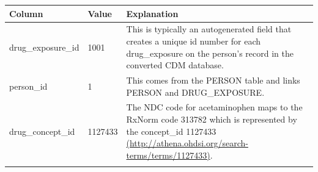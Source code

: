 \documentclass[]{book}
\begin{document}
\begin{longtable}[]{@{}lll@{}}
\toprule
\begin{minipage}[b]{0.30\columnwidth}\raggedright
Column\strut
\end{minipage} & \begin{minipage}[b]{0.14\columnwidth}\raggedright
Value\strut
\end{minipage} & \begin{minipage}[b]{0.48\columnwidth}\raggedright
Explanation\strut
\end{minipage}\tabularnewline
\midrule
\endhead
\begin{minipage}[t]{0.30\columnwidth}\raggedright
drug\_exposure\_id\strut
\end{minipage} & \begin{minipage}[t]{0.14\columnwidth}\raggedright
1001\strut
\end{minipage} & \begin{minipage}[t]{0.48\columnwidth}\raggedright
This is typically an autogenerated field that creates a unique id number for each drug\_exposure on the person's record in the converted CDM database.\strut
\end{minipage}\tabularnewline
\begin{minipage}[t]{0.30\columnwidth}\raggedright
person\_id\strut
\end{minipage} & \begin{minipage}[t]{0.14\columnwidth}\raggedright
1\strut
\end{minipage} & \begin{minipage}[t]{0.48\columnwidth}\raggedright
This comes from the PERSON table and links PERSON and DRUG\_EXPOSURE.\strut
\end{minipage}\tabularnewline
\begin{minipage}[t]{0.30\columnwidth}\raggedright
drug\_concept\_id\strut
\end{minipage} & \begin{minipage}[t]{0.14\columnwidth}\raggedright
1127433\strut
\end{minipage} & \begin{minipage}[t]{0.48\columnwidth}\raggedright
The NDC code for acetaminophen maps to the RxNorm code 313782 which is represented by the concept\_id 1127433 \href{http://athena.ohdsi.org/search-terms/terms/1127433}{(http://athena.ohdsi.org/search-terms/terms/1127433)}.\strut
\end{minipage}\tabularnewline
\begin{minipage}[t]{0.30\columnwidth}\raggedright

\end{minipage}
\end{longtable}
\end{document}
